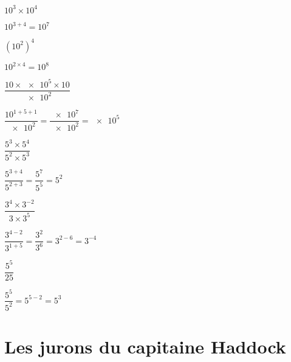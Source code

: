 \documentclass[a4paper,11pt]{exam}
\begin{document}
	\begin{questions}
		\question $10^3 \times 10^4$
	
		\begin{solution}
			$10^{3+4} = 10^7$
		\end{solution}
	
		\question $(10^2)^4$
	
		\begin{solution}
			$10^{2 \times 4} = 10^8$
		\end{solution}
	
		\question  $\dfrac{10 \times \num{e5} \times \num{10}}{\num{e2}} $
		\begin{solution}
			$\dfrac{10^{1+5+1}}{\num{e2}}=\dfrac{\num{e7}}{\num{e2}}=\num{e5}$
		\end{solution}
	    
	    \vspace*{0.5cm}
	     
		\question $\dfrac{5^3 \times 5^4}{5^2 \times 5^3}$
		\begin{solution}
			$\dfrac{5^{3+4}}{5^{2+3}} = \dfrac{5^7}{5^5} = 5^2$
		\end{solution}
	
		\question $\dfrac{3^{4} \times 3^{-2}}{3 \times 3^{5}}$
		\begin{solution}
			$\dfrac{3^{4-2}}{3^{1+5}} = \dfrac{3^{2}}{3^{6}} = 3^{2-6} = 3^{-4}$
		\end{solution}
		
		\question $\dfrac{5^{5}}{25}$
		\begin{solution}
			$\dfrac{5^{5}}{5^{2}} = 5^{5-2} = 5^3$
		\end{solution}
	\end{questions}
	
\section{Les jurons du capitaine Haddock}
	
\end{document}
